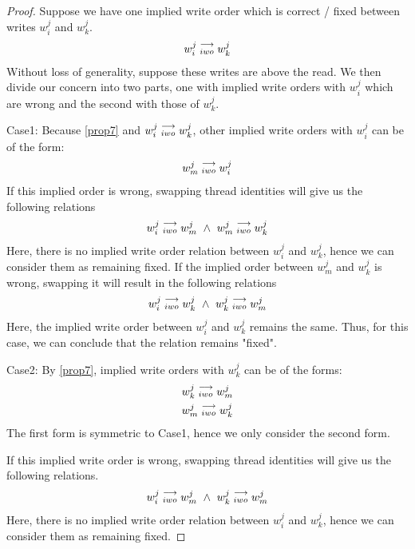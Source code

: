         \begin{proof}
            Suppose we have one implied write order which is correct / fixed between writes $w_i^j$ and $w_k^j$.
            \begin{align}
                w_i^j\stackrel{\longrightarrow}{_{iwo}}w_k^j
            \end{align}
            Without loss of generality, suppose these writes are above the read. We then divide our concern into two parts, one with implied write orders with $w_i^j$ which are wrong and the second with those of $w_k^j$.

            Case1: 
            Because \ref{prop7} and $w_i^j\stackrel{\longrightarrow}{_{iwo}}w_k^j$, other implied write orders with $w_i^j$ can be of the form:
            \begin{align}
                w_m^j\stackrel{\longrightarrow}{_{iwo}}w_i^j
            \end{align}
            If this implied order is wrong, swapping thread identities will  give us the following relations 
            \begin{align}
                \reln{w_i^j}{iwo}{w_m^j} \ \wedge \ \reln{w_m^j}{iwo}{w_k^j}  
            \end{align}  
            Here, there is no implied write order relation between $w_i^j$ and $w_k^j$, hence we can consider them as remaining fixed. 
            If the implied order between $w_m^j$ and $w_k^j$ is wrong, swapping it will result in the following relations
            \begin{align}
                \reln{w_i^j}{iwo}{w_k^j} \ \wedge \ \reln{w_k^j}{iwo}{w_m^j}  
            \end{align}  
            Here, the implied write order between $w_i^j$ and $w_k^j$ remains the same. Thus, for this case, we can conclude that the relation remains "fixed".

            Case2: 
            By \ref{prop7}, implied write orders with $w_k^j$ can be of the forms:
            \begin{align}
                w_k^j\stackrel{\longrightarrow}{_{iwo}}w_m^j \\
                w_m^j\stackrel{\longrightarrow}{_{iwo}}w_k^j 
            \end{align} 
            The first form is symmetric to Case1, hence we only consider the second form. 

            If this implied write order is wrong, swapping thread identities will give us the following relations. 
            \begin{align}
                \reln{w_i^j}{iwo}{w_m^j} \ \wedge \ \reln{w_k^j}{iwo}{w_m^j}
            \end{align}
            Here, there is no implied write order relation between $w_i^j$ and $w_k^j$, hence we can consider them as remaining fixed. 


\end{proof}

